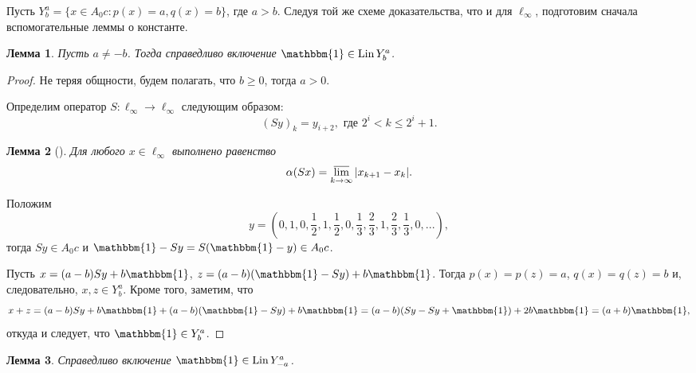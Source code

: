 \documentclass[a4paper,14pt]{article} %
\theoremstyle{plain}
\newtheorem{lemma}{Лемма}[section]
\begin{document}
Пусть $Y^a_b = \{x\in A_0 c : p(x) = a, q(x) = b\}$, где $a>b$.
Следуя той же схеме доказательства, что и для $\ell_\infty$,
подготовим сначала вспомогательные леммы о константе.

\begin{lemma}
	\label{lem:const_Lin_alpha_0}
	Пусть $a\neq -b$.
	Тогда справедливо включение
	$\mathbbm{1}\in \operatorname{Lin} Y^a_b$.
\end{lemma}


\begin{proof}
	Не теряя общности, будем полагать, что $b\geq 0$, тогда $a>0$.

	Определим оператор $S:\ell_\infty \to \ell_\infty$ следующим образом:
	\begin{equation}\label{operator_S}
		(Sy)_k = y_{i+2}, \mbox{ где } 2^i < k \leq 2^i+1
		.
	\end{equation}
	\begin{lemma}[{\cite{our-vzms-2018}}]
		Для любого $x\in \ell_\infty$ выполнено равенство
		\begin{equation}\label{alpha_S}
			\alpha(Sx) = \varlimsup_{k\to\infty} |x_{k+1} - x_{k}|
			.
		\end{equation}
	\end{lemma}
	Положим
	\begin{equation}
		\label{eq:y_for_s_alpha}
		y = \left(0,1,0,\frac{1}{2},1,\frac{1}{2},0,\frac{1}{3},\frac{2}{3},1,\frac{2}{3},\frac{1}{3},0,...\right)
		,
	\end{equation}
	тогда $Sy\in A_0 c$ и $\mathbbm{1}-Sy = S(\mathbbm{1}-y)\in A_0 c$.

	Пусть $x=(a-b)Sy+b\mathbbm{1}$, $z=(a-b)(\mathbbm{1}-Sy)+b\mathbbm{1}$.
	Тогда $p(x)=p(z)=a$, $q(x)=q(z)=b$ и, следовательно, $x,z\in Y^a_b$.
	Кроме того, заметим, что
	\begin{equation}
		x+z = (a-b)Sy+b\mathbbm{1} + (a-b)(\mathbbm{1}-Sy)+b\mathbbm{1}
		=
		(a-b)(Sy-Sy+\mathbbm{1}) + 2 b\mathbbm{1} = (a+b)\mathbbm{1}
		,
	\end{equation}
	откуда и следует, что $\mathbbm{1}\in Y^a_b$.
\end{proof}


\begin{lemma}
	\label{lem:const_Lin_alpha_0_a_eq_-b}
	Справедливо включение
	$\mathbbm{1}\in \operatorname{Lin} Y^a_{-a}$.
\end{lemma}
\end{document}
